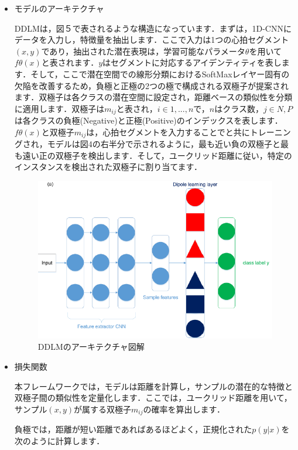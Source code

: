 \documentclass[dvipdfmx]{jsarticle}
\begin{document}
\begin{itemize}
    \item モデルのアーキテクチャ

DDLMは，図５で表されるような構造になっています．まずは，1D-CNNにデータを入力し，特徴量を抽出します．ここで入力は1つの心拍セグメント$(x, y)$であり，抽出された潜在表現は，学習可能なパラメータ$\theta$を用いて$f\theta (x)$と表されます．$y$はセグメントに対応するアイデンティティを表します．そして，ここで潜在空間での線形分類におけるSoftMaxレイヤー固有の欠陥を改善するため，負極と正極の2つの極で構成される双極子が提案されます．双極子は各クラスの潜在空間に設定され，距離ベースの類似性を分類に適用します．双極子は$m_{ij}$と表され，$i \in {1, ..., n}$で，$n$はクラス数，$j \in {N, P}$は各クラスの負極(Negative)と正極(Positive)のインデックスを表します．
$f\theta (x)と双極子m_{ij}$は，心拍セグメントを入力することでと共にトレーニングされ，モデルは図4の右半分で示されるように，最も近い負の双極子と最も遠い正の双極子を検出します．そして，ユークリッド距離に従い，特定のインスタンスを検出された双極子に割り当てます．

\begin{figure}[H]
    \begin{center}
    \includegraphics[width=0.8\linewidth]{./img/ddlm_model.png}
    \end{center}
    \caption{DDLMのアーキテクチャ図解}
\end{figure}

    \item 損失関数

本フレームワークでは，モデルは距離を計算し，サンプルの潜在的な特徴と双極子間の類似性を定量化します．ここでは，ユークリッド距離を用いて，サンプル$(x, y)$が属する双極子$m_{ij}$の確率を算出します．

負極では，距離が短い距離であればあるほどよく，正規化された$p(y|x)$を次のように計算します．


\end{itemize}
\end{document}
